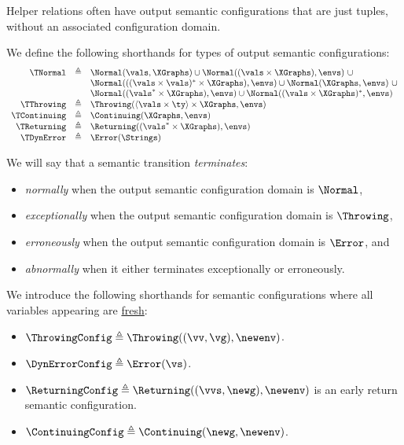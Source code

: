 Helper relations often have output semantic configurations that are just tuples, without an associated configuration domain.

We define the following shorthands for types of output semantic configurations:
\hypertarget{def-tnormal}{}
\hypertarget{def-tcontinuing}{}
\hypertarget{def-tthrowing}{}
\hypertarget{def-treturning}{}
\hypertarget{def-terror}{}
\[
  \begin{array}{rcl}
    \TNormal          & \triangleq & \Normal(\vals, \XGraphs) \cup \Normal((\vals \times \XGraphs), \envs)\ \cup \\
                      &            & \Normal(((\vals \times \vals)^* \times \XGraphs), \envs) \cup  \Normal(\XGraphs, \envs)\ \cup   \\
                      &            & \Normal((\vals^* \times \XGraphs), \envs) \cup \Normal((\vals\times\XGraphs)^*, \envs)\\
    \TThrowing        & \triangleq & \Throwing(\langle\vals \times \ty\rangle \times \XGraphs, \envs)\\
    \TContinuing      & \triangleq & \Continuing(\XGraphs, \envs)\\
    \TReturning       & \triangleq & \Returning((\vals^* \times \XGraphs), \envs)\\
    \TDynError           & \triangleq & \Error(\Strings)\\
  \end{array}
\]

We will say that a semantic transition \emph{terminates}:
\begin{itemize}
\item \emph{normally} when the output semantic configuration domain is
$\Normal$,
\item \emph{exceptionally} when the output semantic configuration domain is
$\Throwing$,
\item \emph{erroneously} when the output semantic configuration domain is
$\Error$, and
\item \emph{abnormally} when it either terminates exceptionally or
erroneously.
\end{itemize}

We introduce the following shorthands for semantic configurations where all variables
appearing are \hyperlink{def-freshvariables}{fresh}:
\begin{itemize}
\hypertarget{def-throwingconfig}{}
\item $\ThrowingConfig \triangleq \Throwing((\vv, \vg), \newenv)$.
\hypertarget{def-errorconfig}{}
\item $\DynErrorConfig \triangleq \Error(\vs)$.
\hypertarget{def-returningconfig}{}
\item $\ReturningConfig \triangleq \Returning((\vvs,\newg), \newenv)$
is an early return semantic configuration.
\hypertarget{def-continuingconfig}{}
\item $\ContinuingConfig \triangleq \Continuing(\newg, \newenv)$.
\end{itemize}

